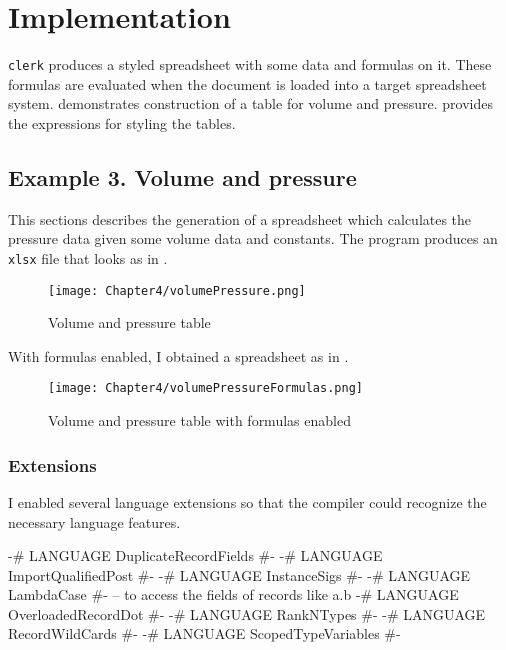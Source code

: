 \chapter{Implementation}
\label{chap:impl}


\texttt{clerk} produces a styled spreadsheet with some data and formulas on it. These formulas are evaluated when the document is loaded into a target spreadsheet system.
 demonstrates construction of a table for volume and pressure.  provides the expressions for styling the tables.

\section{Example 3. Volume and pressure}
\label{sec:ex3}

This sections describes the generation of a spreadsheet which calculates the pressure data given some volume data and constants. The program produces an \texttt{xlsx} file that looks as in .

\begin{figure}[h]
  \centering
  \texttt{[image: Chapter4/volumePressure.png]}
  \caption{Volume and pressure table}
  \label{fig:volumePressure}
\end{figure}

With formulas enabled, I obtained a spreadsheet as in .

\begin{figure}[h]
  \centering
  \texttt{[image: Chapter4/volumePressureFormulas.png]}
  \caption{Volume and pressure table with formulas enabled}
  \label{fig:volumePressureFormulas}
\end{figure}

\subsection{Extensions}

I enabled several language extensions so that the compiler could recognize the necessary language features.


\begin{mycode}
{-# LANGUAGE DuplicateRecordFields #-}
{-# LANGUAGE ImportQualifiedPost #-}
{-# LANGUAGE InstanceSigs #-}
{-# LANGUAGE LambdaCase #-}
-- to access the fields of records like a.b
{-# LANGUAGE OverloadedRecordDot #-}
{-# LANGUAGE RankNTypes #-}
{-# LANGUAGE RecordWildCards #-}
{-# LANGUAGE ScopedTypeVariables #-}
\end{mycode}

